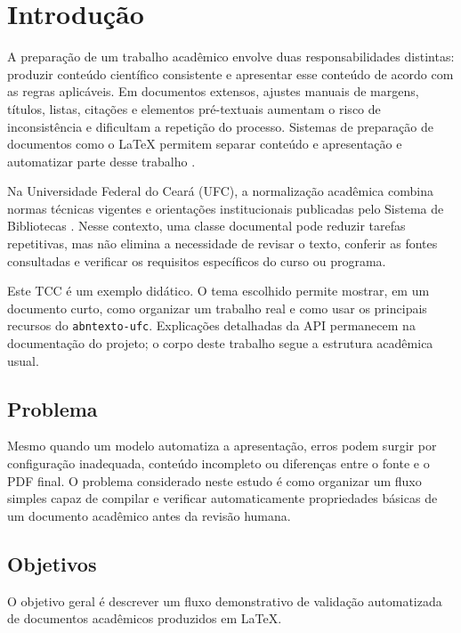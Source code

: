 \section{Introdução}\label{sec:introduction}

A preparação de um trabalho acadêmico envolve duas responsabilidades distintas: produzir conteúdo científico consistente e apresentar esse conteúdo de acordo com as regras aplicáveis. Em documentos extensos, ajustes manuais de margens, títulos, listas, citações e elementos pré-textuais aumentam o risco de inconsistência e dificultam a repetição do processo. Sistemas de preparação de documentos como o LaTeX permitem separar conteúdo e apresentação e automatizar parte desse trabalho \parencite{lamport1994}.

Na Universidade Federal do Ceará (UFC), a normalização acadêmica combina normas técnicas vigentes e orientações institucionais publicadas pelo Sistema de Bibliotecas \parencite{ufc2026normalizacao}. Nesse contexto, uma classe documental pode reduzir tarefas repetitivas, mas não elimina a necessidade de revisar o texto, conferir as fontes consultadas e verificar os requisitos específicos do curso ou programa.

Este TCC é um exemplo didático. O tema escolhido permite mostrar, em um documento curto, como organizar um trabalho real e como usar os principais recursos do \texttt{abntexto-ufc}. Explicações detalhadas da API permanecem na documentação do projeto; o corpo deste trabalho segue a estrutura acadêmica usual.

\subsection{Problema}

Mesmo quando um modelo automatiza a apresentação, erros podem surgir por configuração inadequada, conteúdo incompleto ou diferenças entre o fonte e o PDF final. O problema considerado neste estudo é como organizar um fluxo simples capaz de compilar e verificar automaticamente propriedades básicas de um documento acadêmico antes da revisão humana.

\subsection{Objetivos}

O objetivo geral é descrever um fluxo demonstrativo de validação automatizada de documentos acadêmicos produzidos em LaTeX.

